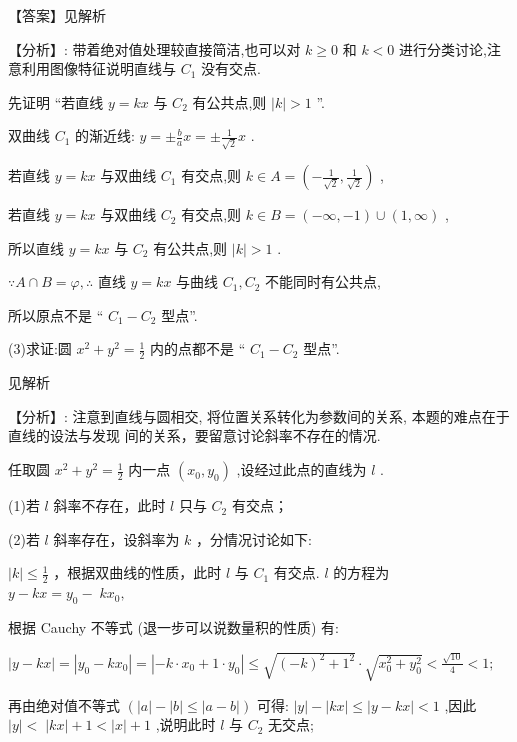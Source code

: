 \documentclass[10pt]{article}
\newcommand*\circled[1]{\tikz[baseline=(char.base)]{\node[shape=circle,draw,inner sep=1.5pt] (char) {\small #1};}}
\begin{document}
【答案】见解析

【分析】: 带着绝对值处理较直接简洁,也可以对 \(k \geq  0\) 和 \(k < 0\) 进行分类讨论,注意利用图像特征说明直线与 \({C}_{1}\) 没有交点.

先证明 “若直线 \(y = {kx}\) 与 \({C}_{2}\) 有公共点,则 \(\left| k\right|  > 1\) ”.

双曲线 \({C}_{1}\) 的渐近线: \(y =  \pm  \frac{b}{a}x =  \pm  \frac{1}{\sqrt{2}}x\) .

若直线 \(y = {kx}\) 与双曲线 \({C}_{1}\) 有交点,则 \(k \in  A = \left( {-\frac{1}{\sqrt{2}},\frac{1}{\sqrt{2}}}\right)\) ,

若直线 \(y = {kx}\) 与双曲线 \({C}_{2}\) 有交点,则 \(k \in  B = \left( {-\infty , - 1}\right)  \cup  \left( {1,\infty }\right)\) ,

所以直线 \(y = {kx}\) 与 \({C}_{2}\) 有公共点,则 \(\left| k\right|  > 1\) .

\(\because A \cap  B = \varphi ,\therefore\) 直线 \(y = {kx}\) 与曲线 \({C}_{1},{C}_{2}\) 不能同时有公共点,

所以原点不是 “ \({C}_{1} - {C}_{2}\) 型点”.

(3)求证:圆 \({x}^{2} + {y}^{2} = \frac{1}{2}\) 内的点都不是 “ \({C}_{1} - {C}_{2}\) 型点”.

见解析

【分析】: 注意到直线与圆相交, 将位置关系转化为参数间的关系, 本题的难点在于直线的设法与发现 \circled{1}  \circled{2} 间的关系，要留意讨论斜率不存在的情况.

任取圆 \({x}^{2} + {y}^{2} = \frac{1}{2}\) 内一点 \(\left( {{x}_{0},{y}_{0}}\right)\) ,设经过此点的直线为 \(l\) .

(1)若 \(l\) 斜率不存在，此时 \(l\) 只与 \({C}_{2}\) 有交点；

(2)若 \(l\) 斜率存在，设斜率为 \(k\) ，分情况讨论如下:

 \circled{1}  \(\left| k\right|  \leq  \frac{1}{2}\) ，根据双曲线的性质，此时 \(l\) 与 \({C}_{1}\) 有交点. \(l\) 的方程为 \(y - {kx} = {y}_{0} - \; k{x}_{0},\)

根据 Cauchy 不等式 (退一步可以说数量积的性质) 有:

\(\left| {y - {kx}}\right|  = \left| {{y}_{0} - k{x}_{0}}\right|  = \left| {-k \cdot  {x}_{0} + 1 \cdot  {y}_{0}}\right|  \leq  \sqrt{{\left( -k\right) }^{2} + {1}^{2}} \cdot  \sqrt{{x}_{0}^{2} + {y}_{0}^{2}} < \frac{\sqrt{10}}{4} < 1;\)

再由绝对值不等式 \(\left( {\left| a\right|  - \left| b\right|  \leq  \left| {a - b}\right| }\right)\) 可得: \(\left| y\right|  - \left| {kx}\right|  \leq  \left| {y - {kx}}\right|  < 1\) ,因此 \(\left| y\right|  < \; \left| {kx}\right|  + 1 < \left| x\right|  + 1\) ,说明此时 \(l\) 与 \({C}_{2}\) 无交点;
\end{document}
